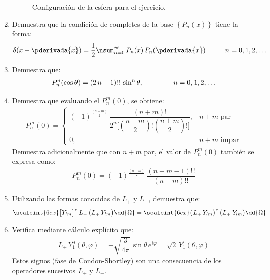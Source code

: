 \begin{enumerate}
\begin{figure}[H]
    \caption{Configuración de la esfera para el ejercicio.}
\end{figure}
\item Demuestra que la condición de completes de la base $\left\{ P_{n} (x) \right\}$ tiene la forma:
\begin{align*}
\delta (x - \pderivada{x}) = \dfrac{1}{2} \nsum_{n=0}^{\infty} \, P_{n} (x) \, P_{n} (\pderivada{x}) \hspace{1cm} n = 0, 1, 2, \ldots 
\end{align*}
\item Demuestra que:
\begin{align*}
P_{n}^{n} (\cos \theta) = (2 \, n - 1)!! \, \sin^{n} \theta, \hspace{1.5cm} n = 0, 1, 2, \ldots
\end{align*}
\item Demuestra que evaluando el $P_{n}^{m}(0)$, se obtiene:
\begin{align*}
P_{n}^{m} (0) = \begin{cases}
(-1)^{\frac{(n-m)}{2}} \, \dfrac{(n + m)!}{2^{n} \bigg[ \left( \dfrac{n - m}{2} \right)! \left( \dfrac{n + m}{2} \right)! \bigg]}, & n + m \mbox{ par} \\
0, & n + m \mbox{ impar}
\end{cases}
\end{align*}
Demuestra adicionalmente que con $n + m$ par, el valor de $P_{n}^{m}(0)$ también se expresa como:
\begin{align*}
P_{n}^{m}(0) = (-1)^{\frac{(n-m)}{2}} \, \dfrac{(n + m - 1)!!}{(n - m)!!}
\end{align*}
\item Utilizando las formas conocidas de $L_{+}$ y $L_{-}$, demuestra que:
\begin{align*}
\scaleint{6ex} \big[ Y_{lm} \big]^{*} \, L_{-} \, \big( L_{+} \, Y_{lm} \big) \dd{\Omega} = \scaleint{6ex} \big( L_{+} \, Y_{lm} \big)^{*} \, \big( L_{+} \, Y_{lm} \big) \dd{\Omega}
\end{align*}
\item Verifica mediante cálculo explícito que:
\begin{align*}
L_{+} \, Y_{1}^{0} (\theta, \varphi) = - \sqrt{\dfrac{3}{4 \pi}} \, \sin \theta \, e^{i \varphi} = \sqrt{2} \, Y_{1}^{1} (\theta, \varphi)
\end{align*}
Estos signos (fase de Condon-Shortley) son una consecuencia de los operadores sucesivos $L_{+}$ y $L_{-}$.

\end{enumerate}
